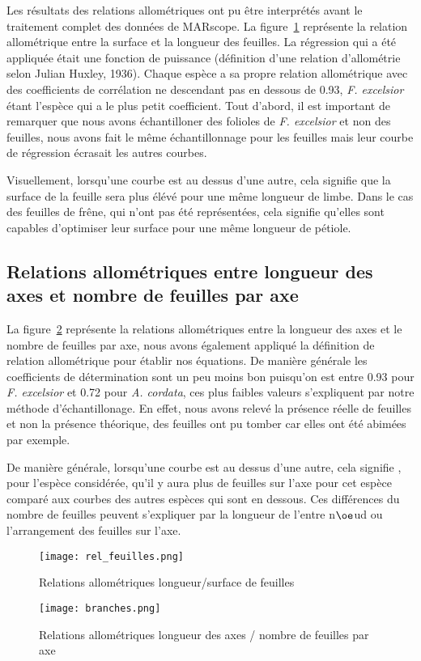 ﻿\documentclass[12pt]{report}
\begin{document}
Les résultats des relations allométriques ont pu être interprétés avant
le traitement complet des données de MARscope. La figure~\ref{fig:feuilles}
représente la relation allométrique entre la surface et la longueur des
feuilles. La régression qui a été appliquée était une
fonction de puissance (définition d'une relation d'allométrie selon Julian
Huxley, 1936). Chaque espèce a sa propre relation allométrique avec des
coefficients de corrélation ne descendant pas en dessous de 0.93, \textit{
F. excelsior} étant l'espèce qui a le plus petit coefficient. Tout d'abord, il
est important de remarquer que nous avons échantilloner des folioles de \textit{
F. excelsior} et non des feuilles, nous avons fait le même échantillonnage pour
les feuilles mais leur courbe de régression écrasait les autres courbes.

Visuellement, lorsqu'une courbe est au dessus d'une autre, cela signifie que la
surface de la feuille sera plus élévé pour une même longueur de limbe. Dans le
cas des feuilles de frêne, qui n'ont pas été représentées, cela signifie
qu'elles sont capables d'optimiser leur surface pour une même longueur de
pétiole.

\subsection{Relations allométriques entre longueur des axes et nombre de
feuilles par axe}

La figure~\ref{fig:branches} représente la relations allométriques 
entre la longueur des axes et le nombre de feuilles par axe, nous avons
également appliqué la définition de relation allométrique pour établir nos
équations. De manière générale les coefficients de détermination sont un peu
moins bon puisqu'on est entre 0.93 pour \textit{F. excelsior} et 0.72 pour
\textit{A. cordata}, ces plus faibles valeurs s'expliquent par notre méthode
d'échantillonage. En effet, nous avons relevé la présence réelle de feuilles et
non la présence théorique, des feuilles ont pu tomber car elles ont été abimées
par exemple.

De manière générale, lorsqu'une courbe est au dessus d'une autre, cela signifie
, pour l'espèce considérée, qu'il y aura plus de feuilles sur l'axe pour cet
espèce comparé aux courbes des autres espèces qui sont en dessous. Ces
différences du nombre de feuilles peuvent s'expliquer par la longueur de l'entre
n$\oe$ud ou l'arrangement des feuilles sur l'axe.

\begin{figure}
    \centering
    \texttt{[image: rel\_feuilles.png]}
    \caption{Relations allométriques longueur/surface de feuilles\label{fig:feuilles}}
\end{figure}
\begin{figure}
    \centering
    \texttt{[image: branches.png]}
    \caption{Relations allométriques longueur des axes / nombre de feuilles par axe\label{fig:branches}}
\end{figure}
\end{document}
